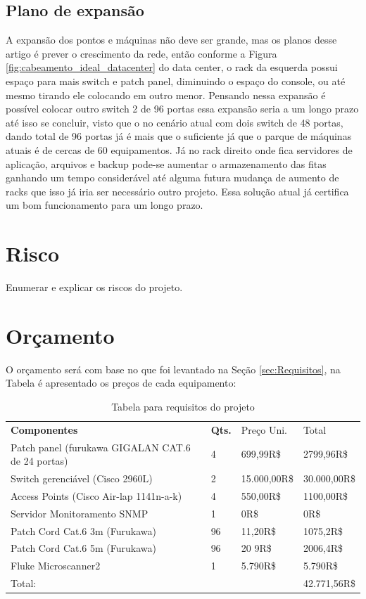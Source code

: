\documentclass[	DIV=calc,%
							paper=a4,%
							fontsize=12pt,%
							onecolumn]{scrartcl}	 					%
\begin{document}
\subsection{Plano de expansão}
A expansão dos pontos e máquinas não deve ser grande, mas os planos desse artigo é prever o crescimento da rede, então conforme a Figura \ref{fig:cabeamento_ideal_datacenter} do data center, o rack da esquerda possui espaço para mais switch e patch panel, diminuindo o espaço do console, ou até mesmo tirando ele colocando em outro menor. Pensando nessa expansão é possível colocar outro switch 2 de 96 portas essa expansão seria a um longo prazo até isso se concluir, visto que o no cenário atual com dois switch de 48 portas, dando total de 96 portas já é mais que o suficiente já que o parque de máquinas atuais é de cercas de 60 equipamentos. Já no rack direito onde fica servidores de aplicação, arquivos e backup pode-se aumentar o armazenamento das fitas ganhando um tempo considerável até alguma futura mudança de aumento de racks que isso já iria ser necessário outro projeto. Essa solução atual já certifica um bom funcionamento para um longo prazo.

\section{Risco}
Enumerar e explicar os riscos do projeto.

\section{Orçamento}
O orçamento será com base no que foi levantado na Seção \ref{sec:Requisitos}, na Tabela  é apresentado os preços de cada equipamento:
\begin{table}[!htbp]
	\centering
	\begin{tabular}{|l|l|l|l|}
		\cline{1-4}
		\textbf{Componentes}        & \textbf{Qts.} &  Preço Uni.          & Total \\
		\cline{1-4}
		Patch panel (furukawa GIGALAN CAT.6 de 24 portas) & 4  & 699,99R\$ 			      &  2799,96R\$ \\
		\cline{1-4}
		Switch gerenciável (Cisco 2960L)                  & 2  & 15.000,00R\$ 			  & 30.000,00R\$  \\
		\cline{1-4}
		Access Points 	   (Cisco Air-lap 1141n-a-k) 	  & 4  & 550,00R\$    			  & 1100,00R\$  \\
		\cline{1-4}
		Servidor Monitoramento SNMP 	 				  & 1  & 0R\$         			  & 0R\$  \\	
		\cline{1-4}
		Patch Cord Cat.6  3m (Furukawa)	   				  & 96 & 11,20R\$  		          & 1075,2R\$   \\
		\cline{1-4}
		Patch Cord Cat.6  5m (Furukawa)	   				  & 96 & 20 9R\$ 		  		  & 2006,4R\$  \\
		\cline{1-4}
		Fluke Microscanner2	   							  & 1  & 5.790R\$ 		  		  & 5.790R\$ \\
		\cline{1-4}
		Total: 											  &    &                          &  42.771,56R\$ \\
		\cline{1-4}
	\end{tabular}
	\caption{Tabela para requisitos do projeto}\label{tab:orcamento}
\end{table}
\end{document}
